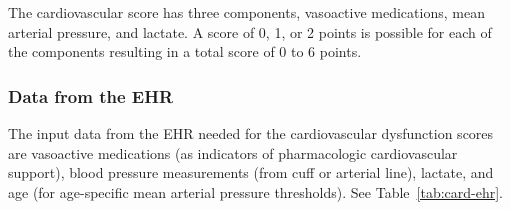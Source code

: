 \documentclass[letterpaper,10pt]{article}
\begin{document}
The cardiovascular score has three components, vasoactive medications,
mean arterial pressure, and lactate. A score of 0, 1, or 2 points is
possible for each of the components resulting in a total score of 0 to 6 points.

\subsubsection{Data from the EHR}\label{sec:card-ehr}

The input data from the EHR needed for the cardiovascular dysfunction
scores are vasoactive medications (as indicators of
pharmacologic cardiovascular support), blood pressure measurements (from
cuff or arterial line), lactate, and age (for age-specific mean arterial
pressure thresholds). See Table~\ref{tab:card-ehr}.
\end{document}
